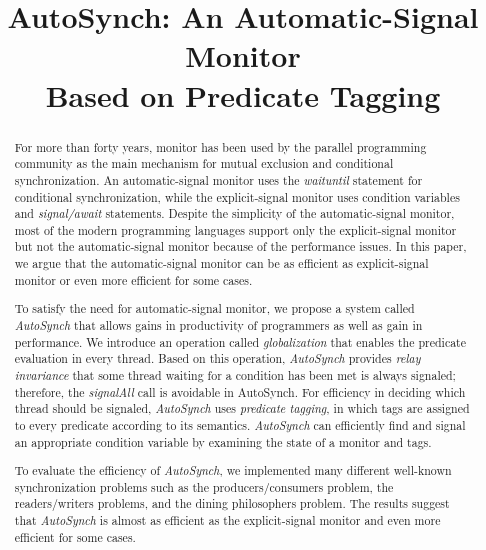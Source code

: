 \documentclass[preprint]{sigplanconf}
\begin{document}
\copyrightdata{[to be supplied]} 


\title{AutoSynch: An Automatic-Signal Monitor \\ Based on Predicate Tagging}
\subtitle{}

\authorinfo{}{}{}

\maketitle

\begin{abstract}
For more than forty years, monitor has been used by the parallel programming 
community as the main mechanism for mutual exclusion and conditional 
synchronization. An 
automatic-signal monitor uses the {\em waituntil} statement for conditional 
synchronization, while the explicit-signal monitor uses condition variables and 
{\em signal/await} statements. Despite the simplicity of the automatic-signal monitor, 
most of the modern programming languages support only the explicit-signal 
monitor but not the automatic-signal monitor because of the performance issues. 
In this paper, we argue that the automatic-signal monitor can be as efficient 
as explicit-signal monitor or even more efficient for some cases.

To satisfy the need for automatic-signal monitor, we propose a system called 
{\em AutoSynch} that allows gains in productivity of 
programmers as well as gain in performance. We introduce an operation called
{\em globalization} that enables the predicate evaluation in
every thread. Based on this operation, {\em AutoSynch} provides {\em relay invariance}
that some thread waiting for a condition has been met is always signaled; 
therefore, the {\em signalAll} call is avoidable in AutoSynch. For efficiency in 
deciding which thread should be signaled, {\em AutoSynch} uses 
{\em predicate tagging}, in which tags are assigned to every predicate according
to its semantics. {\em AutoSynch} can efficiently find and signal an appropriate 
condition variable by examining the state of a monitor and tags. 

To evaluate the efficiency of {\em AutoSynch}, we implemented many different 
well-known synchronization problems such as the producers/consumers problem,
the readers/writers problems, and the dining philosophers problem. The results
suggest that {\em AutoSynch} is almost as efficient as the explicit-signal monitor
and even more efficient for some cases. 

\end{abstract}
\end{document}
